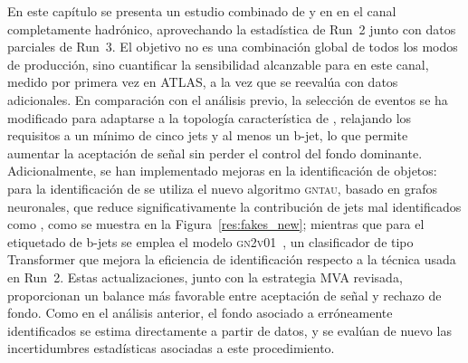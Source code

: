 En este capítulo se presenta un estudio combinado de \ttH y \thqb en \htautau en el canal completamente hadrónico, aprovechando la estadística de Run~2 junto con datos parciales de Run~3. El objetivo no es una combinación global de todos los modos de producción, sino cuantificar la sensibilidad alcanzable para \thqb en este canal, medido por primera vez en ATLAS, a la vez que se reevalúa \ttH con datos adicionales. En comparación con el análisis previo, la selección de eventos se ha modificado para adaptarse a la topología característica de \thqb, 
relajando los requisitos a un mínimo de cinco jets y al menos un b-jet, lo que permite aumentar la aceptación de señal sin perder el control del fondo dominante. Adicionalmente, se han implementado mejoras en la identificación de objetos: para la identificación de \tauhad se utiliza el nuevo algoritmo \textsc{gntau}, basado en grafos neuronales, que reduce significativamente la contribución de jets mal identificados como \tauhad, como se muestra en la Figura~\ref{res:fakes_new}; mientras que para el etiquetado de b-jets se emplea el modelo \textsc{gn2v01}~\cite{new_tagging}, un clasificador de tipo Transformer
que mejora la eficiencia de identificación respecto a la técnica usada en Run~2. Estas actualizaciones, junto con la estrategia MVA revisada, proporcionan un balance más favorable entre aceptación de señal y rechazo de fondo. Como en el análisis anterior, el fondo asociado a \tauhad erróneamente identificados se estima directamente a partir de datos, y se evalúan de nuevo las incertidumbres estadísticas asociadas a este procedimiento.
